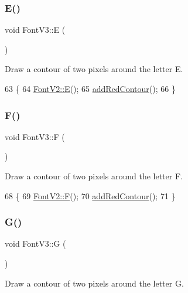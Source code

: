 \subsubsection{\texorpdfstring{E()}{E()}}
{\footnotesize\ttfamily void Font\+V3\+::E (\begin{DoxyParamCaption}{ }\end{DoxyParamCaption})}



Draw a contour of two pixels around the letter E. 


\begin{DoxyCode}
63                \{
64     \mbox{\hyperlink{class_font_v2_a3dc7a171c913a94b688689c69abafeca}{FontV2::E}}();
65     \mbox{\hyperlink{class_font_v3_a639f1eac0eb6724463813270f47e2696}{addRedContour}}();
66 \}
\end{DoxyCode}
\mbox{\label{class_font_v3_af7d35b85d63aeeb5d625cf9623bc3eec}} 
\subsubsection{\texorpdfstring{F()}{F()}}
{\footnotesize\ttfamily void Font\+V3\+::F (\begin{DoxyParamCaption}{ }\end{DoxyParamCaption})}



Draw a contour of two pixels around the letter F. 


\begin{DoxyCode}
68                \{
69     \mbox{\hyperlink{class_font_v2_a061b1fab86aa9bae29fb7460a6ea6401}{FontV2::F}}();
70     \mbox{\hyperlink{class_font_v3_a639f1eac0eb6724463813270f47e2696}{addRedContour}}();
71 \}
\end{DoxyCode}
\mbox{\label{class_font_v3_af526fbb6a2dfc0855b4ac12ffdfcba93}} 
\subsubsection{\texorpdfstring{G()}{G()}}
{\footnotesize\ttfamily void Font\+V3\+::G (\begin{DoxyParamCaption}{ }\end{DoxyParamCaption})}



Draw a contour of two pixels around the letter G. 



